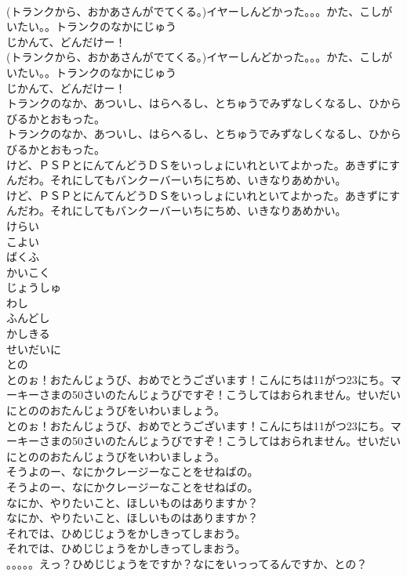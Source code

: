 \documentclass[8pt]{extreport}
\begin{document}
\begin{CJK}{UTF8}{min}
\\	(トランクから、おかあさんがでてくる。)イヤーしんどかった。。。かた、こしがいたい。。トランクのなかにじゅう
\\	じかんて、どんだけー！	
\\	(トランクから、おかあさんがでてくる。)イヤーしんどかった。。。かた、こしがいたい。。トランクのなかにじゅう
\\	じかんて、どんだけー！ 
\\	トランクのなか、あついし、はらへるし、とちゅうでみずなしくなるし、ひからびるかとおもった。	
\\	トランクのなか、あついし、はらへるし、とちゅうでみずなしくなるし、ひからびるかとおもった。 
\\	けど、ＰＳＰとにんてんどうＤＳをいっしょにいれといてよかった。あきずにすんだわ。それにしてもバンクーバーいちにちめ、いきなりあめかい。	
\\	けど、ＰＳＰとにんてんどうＤＳをいっしょにいれといてよかった。あきずにすんだわ。それにしてもバンクーバーいちにちめ、いきなりあめかい。 
\\	けらい
\\	こよい
\\	ばくふ
\\	かいこく
\\	じょうしゅ
\\	わし
\\	ふんどし
\\	かしきる
\\	せいだいに
\\	との
\\	とのぉ！おたんじょうび、おめでとうございます！こんにちは11がつ23にち。マーキーさまの50さいのたんじょうびですぞ！こうしてはおられません。せいだいにとののおたんじょうびをいわいましょう。	
\\	とのぉ！おたんじょうび、おめでとうございます！こんにちは11がつ23にち。マーキーさまの50さいのたんじょうびですぞ！こうしてはおられません。せいだいにとののおたんじょうびをいわいましょう。 
\\	そうよのー、なにかクレージーなことをせねばの。	
\\	そうよのー、なにかクレージーなことをせねばの。 
\\	なにか、やりたいこと、ほしいものはありますか？	
\\	なにか、やりたいこと、ほしいものはありますか？ 
\\	それでは、ひめじじょうをかしきってしまおう。	
\\	それでは、ひめじじょうをかしきってしまおう。 
\\	。。。。。えっ？ひめじじょうをですか？なにをいっってるんですか、との？	

\end{CJK}
\end{document}
